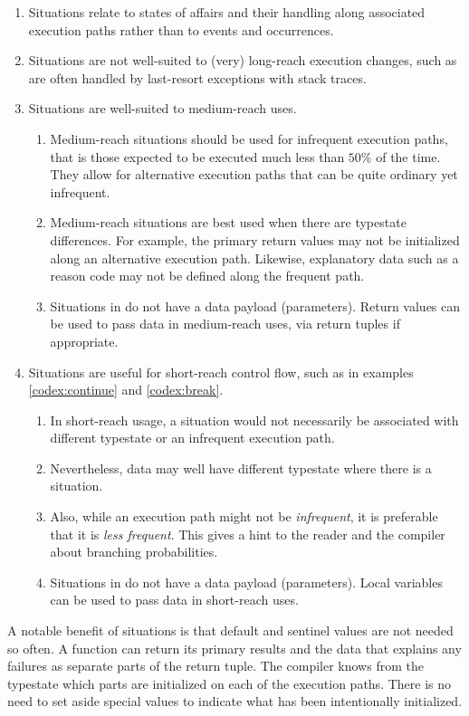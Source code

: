 \documentclass[10pt]{amsart}
\begin{document}
\begin{enumerate}
\item Situations relate to states of affairs and their handling along
  associated execution paths rather than to events and occurrences.
\item Situations are not well-suited to (very) long-reach execution
  changes, such as are often handled by last-resort exceptions with
  stack traces.
\item Situations are well-suited to medium-reach uses.
  \begin{enumerate}
  \item Medium-reach situations should be used for infrequent
    execution paths, that is those expected to be executed much less
    than $50\%$ of the time.  They allow for alternative execution
    paths that can be quite ordinary yet infrequent.
  \item Medium-reach situations are best used when there are typestate
    differences.  For example, the primary return values may not be
    initialized along an alternative execution path.  Likewise,
    explanatory data such as a reason code may not be defined along
    the frequent path.
  \item Situations in \Utop do not have a data payload (parameters).
    Return values can be used to pass data in medium-reach uses,
    via return tuples if appropriate.
  \end{enumerate}
\item Situations are useful for short-reach control flow, such as in
  examples \ref{codex:continue} and \ref{codex:break}.
  \begin{enumerate}
  \item In short-reach usage, a situation would not necessarily be
    associated with different typestate or an infrequent execution
    path.
  \item Nevertheless, data may well have different typestate where
    there is a situation.
  \item Also, while an execution path might not be \emph{infrequent},
    it is preferable that it is \emph{less frequent}.  This gives a
    hint to the reader and the compiler about branching probabilities.
  \item Situations in \Utop do not have a data payload (parameters).
    Local variables can be used to pass data in short-reach uses.
  \end{enumerate}
\end{enumerate}

A notable benefit of situations is that default and sentinel values
are not needed so often.  A function can return its primary results
and the data that explains any failures as separate parts of the
return tuple.  The compiler knows from the typestate which parts are
initialized on each of the execution paths.  There is no need to set
aside special values to indicate what has been intentionally
initialized.
\end{document}
